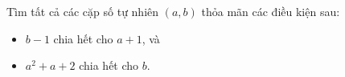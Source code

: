 \ifshowproblem
\begin{problem}\label{example:RUS-2015-TST-D9-P1}
    Tìm tất cả các cặp số tự nhiên \( (a, b) \) thỏa mãn các điều kiện sau:
    \begin{itemize}[topsep=0pt, partopsep=0pt, itemsep=0pt]
        \item \( b - 1 \) chia hết cho \( a + 1 \), và
        \item \( a^2 + a + 2 \) chia hết cho \( b \).
    \end{itemize}
\end{problem}
\fi

\footnotemark
{}
\fi
